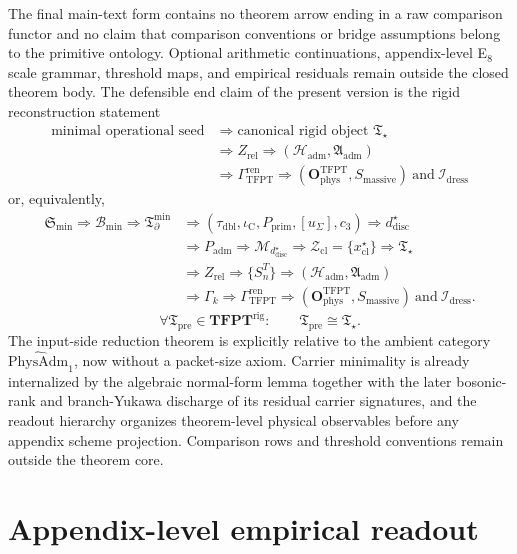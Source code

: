 \documentclass[11pt,a4paper]{article}
\theoremstyle{definition}
\theoremstyle{remark}
\newcommand{\taudbl}{\tau_{\mathrm{dbl}}}
\newcommand{\iC}{\iota_{\mathrm C}}
\newcommand{\cthree}{c_3}
\newcommand{\Tbound}{\mathfrak T_{\partial}^{\min}}
\newcommand{\Padm}{P_{\mathrm{adm}}}
\newcommand{\Pprim}{P_{\mathrm{prim}}}
\newcommand{\Tpre}{\mathfrak T_{\mathrm{pre}}}
\newcommand{\Tstar}{\mathfrak T_{\star}}
\newcommand{\PhysAdmOne}{\widehat{\mathrm{PhysAdm}}_1}
\newcommand{\OphysTFPT}{\mathbf O_{\mathrm{phys}}^{\mathrm{TFPT}}}
\begin{document}
The final main-text form contains no theorem arrow ending in a raw comparison functor and no claim
that comparison conventions or bridge assumptions belong to the primitive ontology. Optional
arithmetic continuations, appendix-level E$_8$ scale grammar, threshold maps, and empirical
residuals remain outside the closed theorem body. The defensible end claim of the present version
is the rigid reconstruction statement
\[
\boxed{
\begin{aligned}
\text{minimal operational seed}
&\Longrightarrow \text{canonical rigid object }\Tstar\\
&\Longrightarrow Z_{\mathrm{rel}}
\Longrightarrow (\mathcal H_{\mathrm{adm}},\mathfrak A_{\mathrm{adm}})\\
&\Longrightarrow \Gamma_{\mathrm{TFPT}}^{\mathrm{ren}}
\Longrightarrow (\OphysTFPT,S_{\mathrm{massive}})
\ \text{and}\ \mathcal I_{\mathrm{dress}}
\end{aligned}}
\]
or, equivalently,
\[
\begin{aligned}
\mathfrak S_{\min}
\Rightarrow
\mathcal B_{\min}
\Rightarrow
\Tbound
&\Rightarrow
(\taudbl,\iC,\Pprim,[u_\Sigma],\cthree)
\Rightarrow
d^\star_{\mathrm{disc}}\\
&\Rightarrow
\Padm
\Rightarrow
\mathcal M_{d^\star_{\mathrm{disc}}}
\Rightarrow
\mathcal Z_{\mathrm{cl}}=\{x^\star_{\mathrm{cl}}\}
\Rightarrow
\Tstar\\
&\Rightarrow
Z_{\mathrm{rel}}
\Rightarrow
\{S_n^T\}
\Rightarrow
(\mathcal H_{\mathrm{adm}},\mathfrak A_{\mathrm{adm}})\\
&\Rightarrow
\Gamma_k
\Rightarrow
\Gamma_{\mathrm{TFPT}}^{\mathrm{ren}}
\Rightarrow
(\OphysTFPT,S_{\mathrm{massive}})
\ \text{and}\ \mathcal I_{\mathrm{dress}}.
\end{aligned}
\]
\[
\forall \Tpre\in\mathbf{TFPT}^{\mathrm{rig}}:\qquad
\Tpre\cong \Tstar.
\]
The input-side reduction theorem is explicitly relative to the ambient category
$\PhysAdmOne$, now without a packet-size axiom. Carrier minimality is already internalized by
the algebraic normal-form lemma together with the later bosonic-rank and branch-Yukawa discharge of
its residual carrier signatures, and
the readout hierarchy organizes theorem-level physical observables before any appendix scheme
projection. Comparison rows and threshold conventions remain outside the theorem core.

\appendix

\section{Appendix-level empirical readout}
\label{sec:appendix-empirical-readout}
\label{app:comparison}
\end{document}
